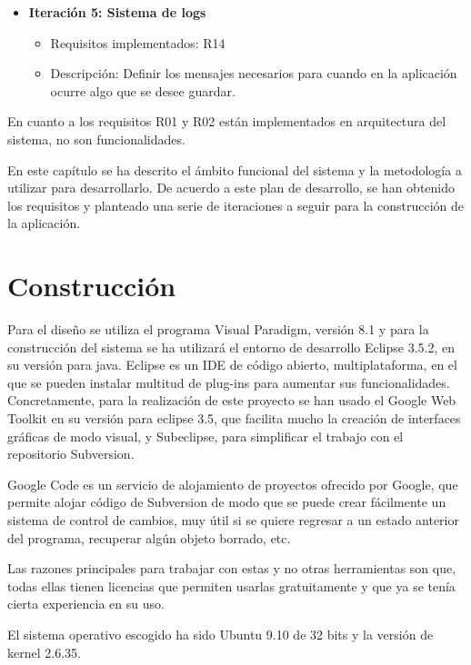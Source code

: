 \begin{itemize}
    \item {\bfseries Iteración 5: Sistema de logs}
    \begin{itemize}
        \item Requisitos implementados: R14
        \item Descripción: Definir los mensajes necesarios para cuando en la aplicación ocurre algo que se desee guardar.
    \end{itemize}
\end{itemize}


En cuanto a los requisitos R01 y R02 están implementados en arquitectura del sistema, no son funcionalidades.
\newline

En este capítulo se ha descrito el ámbito funcional del sistema y la metodología a utilizar para desarrollarlo. De acuerdo a este plan de desarrollo, se han obtenido los requisitos y planteado una serie de iteraciones a seguir para la construcción de la aplicación.
\newline



\section{Construcción}
\label{sec:planificacion:construccion}

Para el diseño se utiliza el programa Visual Paradigm, versión 8.1 y para la construcción del sistema se ha utilizará el entorno de desarrollo Eclipse 3.5.2, en su versión para java.
Eclipse es un IDE de código abierto, multiplataforma, en el que se pueden instalar multitud de plug-ins para aumentar sus funcionalidades. Concretamente, para la realización de este proyecto se han usado el Google Web Toolkit en su versión para eclipse 3.5, que facilita mucho la creación de interfaces gráficas de modo visual, y Subeclipse, para simplificar el trabajo con el repositorio Subversion.
\newline

Google Code es un servicio de alojamiento de proyectos ofrecido por Google, que permite alojar código de Subversion de modo que se puede crear fácilmente un sistema de control de cambios, muy útil si se quiere regresar a un estado anterior del programa, recuperar algún objeto borrado, etc.
\newline

Las razones principales para trabajar con estas y no otras herramientas son que, todas ellas tienen licencias que permiten usarlas gratuitamente y que ya se tenía cierta experiencia en su uso.
\newline

El sistema operativo escogido ha sido Ubuntu 9.10 de 32 bits y la versión de kernel 2.6.35.
\newline